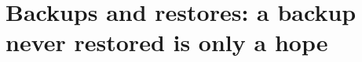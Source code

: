 \chapter{Backups and restores: a backup never restored is only a hope}
\label{ch:backups-and-restores-a-backup-never}

